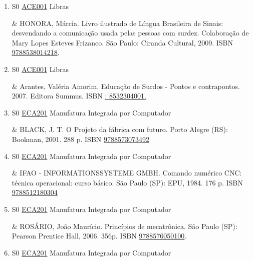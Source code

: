 \documentclass[12pt,a4paper]{book}
\begin{document}
\begin{enumerate}
&   GESSER, Andrei.  Libras? Que língua é essa?: crenças e preconceitos em 
torno da língua de sinais e da realidade surda.  São Paulo: Parábola, 
2009.  ISBN \href{http://www.bn.br/site/pages/servicosProfissionais/agenciaISBN/isbnBusca/FbnBuscaISBNCatalogo.asp?pField=ISBN&pIntPagina=1&pISBN=79340017&nidbISBN=true&hidbISBN=true}{9788579340017}

 

 \item S0 \hyperref[PUD:ACE001]{ACE001} Libras

&   HONORA, Márcia.  Livro ilustrado de Língua Brasileira de Sinais: desvendando a comunicação usada pelas pessoas com surdez.  Colaboração de  Mary Lopes Esteves Frizanco.  São Paulo: Ciranda Cultural, 2009.  ISBN \href{http://www.bn.br/site/pages/servicosProfissionais/agenciaISBN/isbnBusca/FbnBuscaISBNCatalogo.asp?pField=ISBN&pIntPagina=1&pISBN=38014218&nidbISBN=true&hidbISBN=true}{9788538014218}. 

 

 \item S0 \hyperref[PUD:ACE001]{ACE001} Libras

&   Arantes, Valéria Amorim.  Educação de Surdos - Pontos e contrapontos.  2007.  Editora Summus.  ISBN \href{http://www.google.com/search?hl=pt-BR&tbo=p&tbm=bks&q=isbn:: 8532304001.&num=10}{: 8532304001.}
 \item S0 \hyperref[PUD:ECA201]{ECA201} Manufatura Integrada por Computador

&  BLACK, J.  T.  O Projeto da fábrica com futuro.  Porto Alegre (RS): Bookman, 2001.  288 p.    ISBN \href{http://www.bn.br/site/pages/servicosProfissionais/agenciaISBN/isbnBusca/FbnBuscaISBNCatalogo.asp?pField=ISBN&pIntPagina=1&pISBN=73073492&nidbISBN=true&hidbISBN=true}{9788573073492}
 

 \item S0 \hyperref[PUD:ECA201]{ECA201} Manufatura Integrada por Computador

&   IFAO - INFORMATIONSSYSTEME GMBH.  Comando numérico CNC: técnica operacional: curso básico.  São Paulo (SP): EPU, 1984.  176 p.  ISBN \href{http://www.bn.br/site/pages/servicosProfissionais/agenciaISBN/isbnBusca/FbnBuscaISBNCatalogo.asp?pField=ISBN&pIntPagina=1&pISBN=12180304&nidbISBN=true&hidbISBN=true}{9788512180304}
 

 \item S0 \hyperref[PUD:ECA201]{ECA201} Manufatura Integrada por Computador

&  ROSÁRIO, João Maurício.  Princípios de mecatrônica.  São Paulo (SP): Pearson Prentice Hall, 2006.  356p.  ISBN \href{http://www.bn.br/site/pages/servicosProfissionais/agenciaISBN/isbnBusca/FbnBuscaISBNCatalogo.asp?pField=ISBN&pIntPagina=1&pISBN=76050100&nidbISBN=true&hidbISBN=true}{9788576050100}.
 \item S0 \hyperref[PUD:ECA201]{ECA201} Manufatura Integrada por Computador


\end{enumerate}
\end{document}
